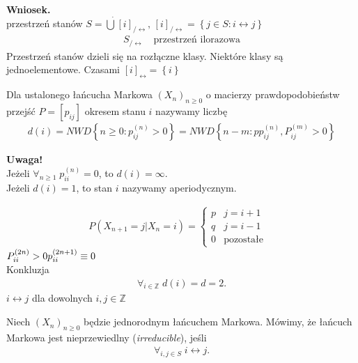 \textbf{Wniosek.}\\
przestrzeń stanów $ S=\dot \bigcup[i]_{/\leftrightarrow},\,[i]_{/\leftrightarrow}= \left\{j\in S:i\longleftrightarrow j\right\}$
\begin{gather*}
S_{/\leftrightarrow}\quad \text{przestrzeń ilorazowa}
\end{gather*}
Przestrzeń stanów dzieli się na rozłączne klasy. Niektóre klasy są jednoelementowe. Czasami $ [i]_{\leftrightarrow}=\left\{i\right\} $
\begin{defi}
Dla ustalonego łańcucha Markowa $ \left(X_n\right)_{n\ge 0} $ o macierzy prawdopodobieństw przejść $ P=\left[p_{ij}\right] $ okresem stanu $ i $ nazywamy liczbę
\begin{gather*}
d(i)=NWD\left\{n\ge0:p_{ij}^{(n)}>0\right\}=
NWD\left\{n-m:pp_{ij}^{(n)},P_{ij}^{(m)}>0\right\}
\end{gather*}
\end{defi}
\textbf{Uwaga!}\\
Jeżeli $ \forall_{n\ge 1}\;p_{ii}^{(n)}=0 $, to $ d(i)=\infty  $.\\
Jeżeli $ d(i)=1 $, to stan $ i $ nazywamy aperiodycznym.
\begin{prz}
\begin{gather*}
P\left(X_{n+1}=j|X_n=i\right)=\left \{
\begin{array}{lll}
	p & j=i+1            &  \\
	q & j=i-1            &  \\
	0 & \text{pozostałe} &
\end{array}
\right .
\end{gather*}
$ P_{ii}^{(2n)}>0\\
p_{ii}^{(2n+1)}\equiv0 $\\
Konkluzja
\begin{gather*}
\forall_{i\in \mathbb Z}\;d(i)=d=2.
\end{gather*}
$ i\longleftrightarrow j $ dla dowolnych $ i,j\in \mathbb Z $
\end{prz}
\begin{defi}
Niech $ \left(X_n\right)_{n\ge 0} $ będzie jednorodnym łańcuchem Markowa. Mówimy, że łańcuch Markowa jest nieprzewiedlny (\emph{irreducible}), jeśli
\begin{gather*}
\forall_{i,j\in S}\;i\longleftrightarrow j.
\end{gather*}
\end{defi}